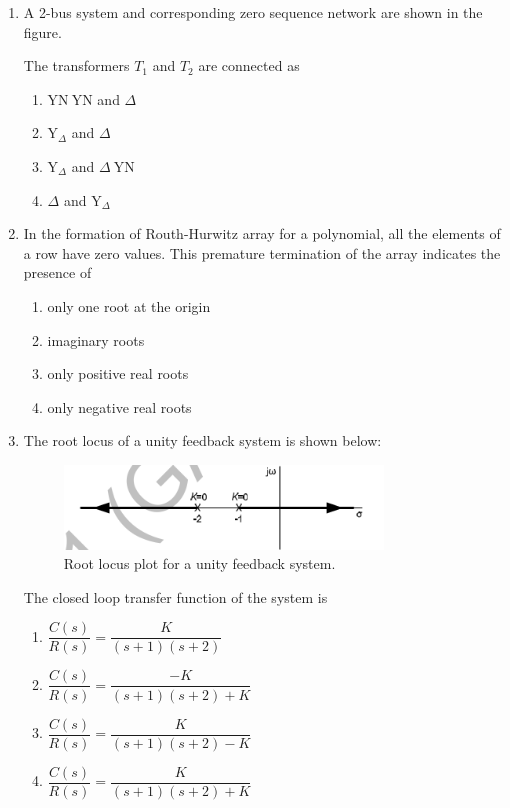 \documentclass[journal,12pt,onecolumn]{IEEEtran}
\begin{document}
\begin{enumerate}[label=Q\arabic*:, leftmargin=*, itemindent=0pt, start=16]

\item A 2-bus system and corresponding zero sequence network are shown in the figure.



The transformers $T_1$ and $T_2$ are connected as
\begin{enumerate}[label=(\Alph*)]
    \item $\text{YN}~\text{YN}$ and $\Delta$
    \item $\text{Y}_{\Delta}$ and $\Delta$
    \item $\text{Y}_{\Delta}$ and $\Delta~\text{YN}$
    \item $\Delta$ and $\text{Y}_{\Delta}$
\end{enumerate}

\item In the formation of Routh-Hurwitz array for a polynomial, all the elements of a row have zero values. This premature termination of the array indicates the presence of
\begin{enumerate}[label=(\Alph*)]
    \item only one root at the origin
    \item imaginary roots
    \item only positive real roots
    \item only negative real roots
\end{enumerate}

\item The root locus of a unity feedback system is shown below:
\begin{figure}[h]
    \centering
    \includegraphics[width=0.8\textwidth]{figs/f1.png}
    \caption{Root locus plot for a unity feedback system.}
    \label{fig:root_locus}
\end{figure}

The closed loop transfer function of the system is
\begin{enumerate}[label=(\Alph*)]
    \item $\dfrac{C(s)}{R(s)} = \dfrac{K}{(s+1)(s+2)}$
    \item $\dfrac{C(s)}{R(s)} = \dfrac{-K}{(s+1)(s+2)+K}$
    \item $\dfrac{C(s)}{R(s)} = \dfrac{K}{(s+1)(s+2) - K}$
    \item $\dfrac{C(s)}{R(s)} = \dfrac{K}{(s+1)(s+2) + K}$
\end{enumerate}


\end{enumerate}
\end{document}
